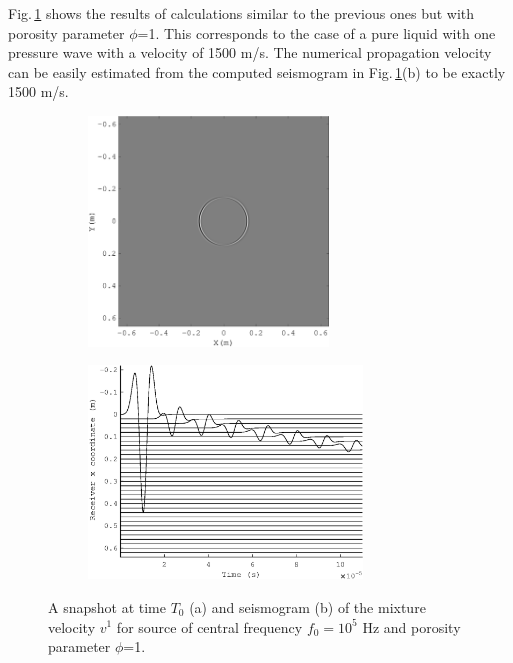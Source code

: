 \documentclass[3p,times,table]{article}
\begin{document}
 Fig.\,\ref{fig:porosity 1} shows the results of calculations similar to the previous ones 
but with  porosity parameter $\phi$=1. This corresponds to the case of a pure 
liquid with one pressure wave with a velocity of 1500 m/s. The numerical 
propagation velocity can be easily estimated from the computed seismogram in  
Fig.\,\ref{fig:porosity 1}(b) to be exactly 1500 m/s.
\begin{figure}[!htbp]
\begin{subfigure}{0.5\linewidth}
\includegraphics[draft=false,width=0.7\textwidth]{Figures/wave_alfa_s_00}
\caption{}
\end{subfigure}
\hfill
\begin{subfigure}{0.5\linewidth}
\includegraphics[draft=false,width=0.8\textwidth]{Figures/alfa_s_00}
\caption{}
\end{subfigure}%
\caption{A snapshot at time $T_{0}$ (a) and seismogram (b) of the mixture 
velocity $v^1$  for source of central frequency $f_{0} =10^{5} $ Hz  and 
porosity 
parameter $\phi$=1.}
\label{fig:porosity 1}
\end{figure}
\end{document}
